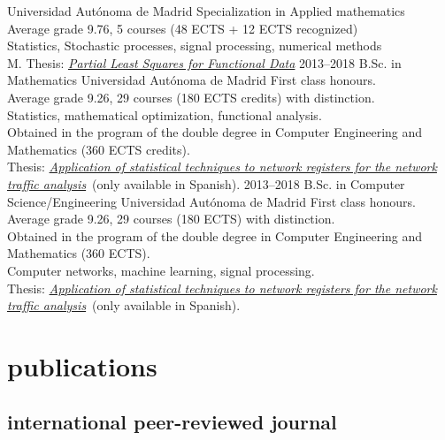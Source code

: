 \documentclass[]{friggeri-cv}
\newcommand{\tfg}[0]{\href{https://repositorio.uam.es/bitstream/handle/10486/688211/perdices_burrero_daniel_tfg.pdf?sequence=1&isAllowed=y}{\emph{Application of statistical techniques to network registers for the network traffic analysis}}}
\begin{document}
\begin{entrylist}
    {Universidad Autónoma de Madrid}
    {Specialization in Applied mathematics\\
    Average grade 9.76, 5 courses (48 ECTS + 12 ECTS recognized)\\
    Statistics, Stochastic processes, signal processing, numerical methods\\
    M. Thesis: \href{https://dperdices.github.io/resources/Partial_Least_Squares_for_Functional_Data.pdf}{\emph{Partial Least Squares for Functional Data}}
    }
\entry
    {2013–2018}
    {B.Sc. in Mathematics}
    {Universidad Autónoma de Madrid}
    {First class honours.\\
    Average grade 9.26, 29 courses  (180 ECTS credits) with distinction. \\
    Statistics, mathematical optimization, functional analysis.\\
    Obtained in the program of the double degree in Computer Engineering and Mathematics (360 ECTS credits).\\
    Thesis: \tfg~(only available in Spanish).
    }
\entry
    {2013–2018}
    {B.Sc. in Computer Science/Engineering}
    {Universidad Autónoma de Madrid}
    {First class honours.\\
    Average grade 9.26, 29 courses  (180 ECTS) with distinction. \\
    Obtained in the program of the double degree in Computer Engineering and Mathematics (360 ECTS).\\
    Computer networks, machine learning, signal processing.\\
    Thesis: \tfg~(only available in Spanish).}
\end{entrylist}
\newpage
\section{publications}

\nocite{*}
\subsection{international peer-reviewed journal}
\begin{refsegment}
  \nocite{*}
  \printbibliography[sorting=chronological, type=article, notkeyword={spanish}, heading=none]
\end{refsegment}
\end{document}
